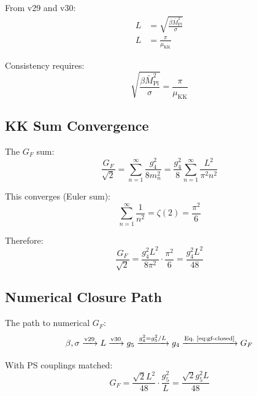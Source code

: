 \documentclass[11pt,a4paper]{article}
\begin{document}
From v29 and v30:
\begin{align}
\label{eq:L-from-beta}
L &= \sqrt{\frac{\beta \bar{M}_{\text{Pl}}^2}{\sigma}} \\
\label{eq:L-from-lambda}
L &= \frac{\pi}{\mu_{\text{KK}}}
\end{align}

Consistency requires:
\begin{equation}
\label{eq:L-consistency}
\sqrt{\frac{\beta \bar{M}_{\text{Pl}}^2}{\sigma}} = \frac{\pi}{\mu_{\text{KK}}}
\end{equation}

\subsection{KK Sum Convergence}
\label{subsec:kk-convergence}

The $G_F$ sum:
\begin{equation}
\label{eq:gf-sum-conv}
\frac{G_F}{\sqrt{2}} = \sum_{n=1}^{\infty} \frac{g_4^2}{8 m_n^2} = \frac{g_4^2}{8} \sum_{n=1}^{\infty} \frac{L^2}{\pi^2 n^2}
\end{equation}

This converges (Euler sum):
\begin{equation}
\label{eq:euler-zeta}
\sum_{n=1}^{\infty} \frac{1}{n^2} = \zeta(2) = \frac{\pi^2}{6}
\end{equation}

Therefore:
\begin{equation}
\label{eq:gf-closed}
\frac{G_F}{\sqrt{2}} = \frac{g_4^2 L^2}{8\pi^2} \cdot \frac{\pi^2}{6} = \frac{g_4^2 L^2}{48}
\end{equation}

\subsection{Numerical Closure Path}
\label{subsec:closure-path}

The path to numerical $G_F$:
\begin{equation}
\label{eq:closure-chain}
\beta, \sigma \xrightarrow{\text{v29}} L \xrightarrow{\text{v30}} g_5 \xrightarrow{g_4^2 = g_5^2/L} g_4 \xrightarrow{\text{Eq.~\eqref{eq:gf-closed}}} G_F
\end{equation}

With PS couplings matched:
\begin{equation}
\label{eq:gf-ps-form}
G_F = \frac{\sqrt{2} L^2}{48} \cdot \frac{g_5^2}{L} = \frac{\sqrt{2} g_5^2 L}{48}
\end{equation}
\end{document}
